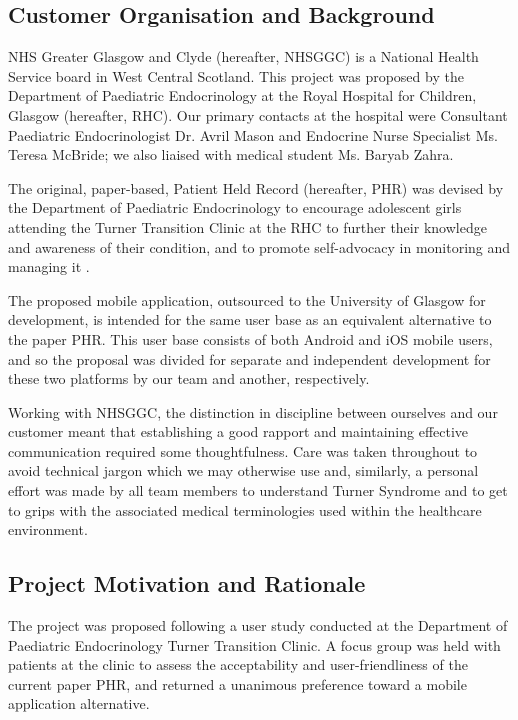 \documentclass{l3proj}
\begin{document}
\subsection{Customer Organisation and Background}\label {sec:2.1}
NHS Greater Glasgow and Clyde (hereafter, NHSGGC) is a National Health Service board in West Central Scotland. This project was proposed by the Department of Paediatric Endocrinology at the Royal Hospital for Children, Glasgow (hereafter, RHC). Our primary contacts at the hospital were Consultant Paediatric Endocrinologist Dr. Avril Mason and Endocrine Nurse Specialist Ms. Teresa McBride; we also liaised with medical student Ms. Baryab Zahra.

The original, paper-based, Patient Held Record (hereafter, PHR) was devised by the Department of Paediatric Endocrinology to encourage adolescent girls attending the Turner Transition Clinic at the RHC to further their knowledge and awareness of their condition, and to promote self-advocacy in monitoring and managing it \cite{paperPHR}.

The proposed mobile application, outsourced to the University of Glasgow for development, is intended for the same user base as an equivalent alternative to the paper PHR. This user base consists of both Android and iOS mobile users, and so the proposal was divided for separate and independent development for these two platforms by our team and another, respectively.

Working with NHSGGC, the distinction in discipline between ourselves and our customer meant that establishing a good rapport and maintaining effective communication required some thoughtfulness. Care was taken throughout to avoid technical jargon which we may otherwise use and, similarly, a personal effort was made by all team members to understand Turner Syndrome and to get to grips with the associated medical terminologies used within the healthcare environment.


\subsection{Project Motivation and Rationale}\label {sec:2.2}
The project was proposed following a user study conducted at the Department of Paediatric Endocrinology Turner Transition Clinic. A focus group was held with patients at the clinic to assess the acceptability and user-friendliness of the current paper PHR, and returned a unanimous preference toward a mobile application alternative.
\end{document}
